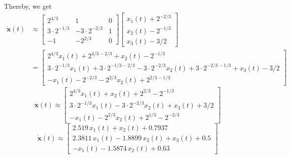 Thereby, we get
\begin{align*}
    \mathbf{\dot x}(t)
     & \approx
    \begin{bmatrix}
        2^{4/3}         & 1                & 0 \\
        3\cdot 2^{-1/3} & -3\cdot 2^{-2/3} & 1 \\
        -1              & -2^{2/3}         & 0
    \end{bmatrix}
    \begin{bmatrix}
        x_1(t) + 2^{-2/3} \\
        x_2(t) - 2^{-1/3} \\
        x_3(t) - 3/2
    \end{bmatrix} \\
     & =
    \begin{bmatrix}
        2^{4/3}x_1(t) + 2^{4/3-2/3} + x_2(t) - 2^{-1/3}                                                          \\
        3\cdot 2^{-1/3}x_1(t) + 3\cdot 2^{-1/3-2/3} - 3\cdot 2^{-2/3}x_2(t) + 3\cdot 2^{-2/3-1/3} + x_3(t) - 3/2 \\
        -x_1(t) - 2^{-2/3} - 2^{2/3}x_2(t) + 2^{2/3-1/3}
    \end{bmatrix}
\end{align*}
\[
    \boxed{
        \mathbf{\dot x}(t) \approx
        \begin{bmatrix}
            2^{4/3}x_1(t) + x_2(t) + 2^{2/3} - 2^{-1/3}                  \\
            3\cdot 2^{-1/3}x_1(t) - 3\cdot 2^{-2/3}x_2(t) + x_3(t) + 3/2 \\
            -x_1(t) - 2^{2/3}x_2(t) + 2^{1/3} - 2^{-2/3}
        \end{bmatrix}
    }
\]
\[
    \mathbf{\dot x}(t) \approx
    \begin{bmatrix}
        2.519\, x_1(t) + x_2(t) + 0.7937                 \\
        2.3811\, x_1(t) - 1.8899\, x_2(t) + x_3(t) + 0.5 \\
        -x_1(t) - 1.5874\, x_2(t) + 0.63
    \end{bmatrix}
\]
